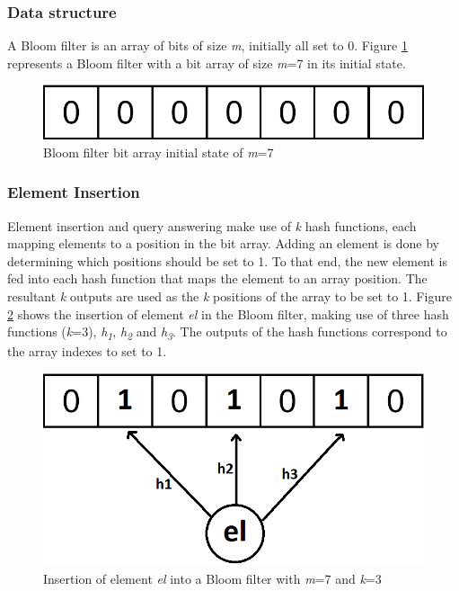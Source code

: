 \subsubsection*{Data structure}
A Bloom filter is an array of bits of size \textit{m}, initially all set to 0. Figure \ref{fig:initial-bloom-filter} represents a Bloom filter with a bit array of size \textit{m}=7 in its initial state.

\begin{figure}[!htb]
    \begin{center}
      \includegraphics[scale=1.1]{figures/initial-bloom.png}
      \caption[Bloom filter initial state]{Bloom filter bit array initial state of \textit{m}=7}
      \label{fig:initial-bloom-filter}
    \end{center}
\end{figure}

\subsubsection*{Element Insertion}
Element insertion and query answering make use of \textit{k} hash functions, each mapping elements to a position in the bit array. Adding an element is done by determining which positions should be set to 1. To that end, the new element is fed into each hash function that maps the element to an array position. The resultant \textit{k} outputs are used as the \textit{k} positions of the array to be set to 1. Figure \ref{fig:insertion-bloom-filter} shows the insertion of element \textit{el} in the Bloom filter, making use of three hash functions (\textit{k}=3), \textit{h\textsubscript{1}}, \textit{h\textsubscript{2}} and \textit{h\textsubscript{3}}. The outputs of the hash functions correspond to the array indexes to set to 1.

\begin{figure}[!htb]
    \begin{center}
      \includegraphics[scale=0.4]{figures/insert-bloom.png}
      \caption[Bloom filter insertion]{Insertion of element \textit{el} into a Bloom filter with \textit{m}=7 and \textit{k}=3}
      \label{fig:insertion-bloom-filter}
    \end{center}
\end{figure}

